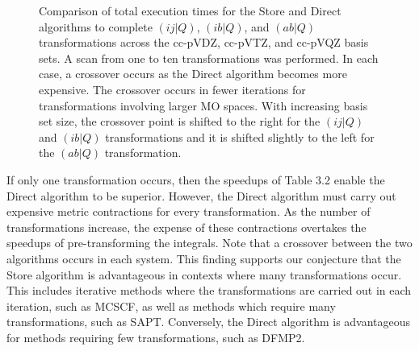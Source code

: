 \begin{figure}[H]
  \hfill
  \caption{Comparison of total execution times for the Store and Direct algorithms to complete $(ij|Q)$, $(ib|Q)$, and $(ab|Q)$ transformations
across the cc-pVDZ, cc-pVTZ, and cc-pVQZ basis sets. A scan from one to ten transformations was performed. In each case, a crossover
occurs as the Direct algorithm becomes more expensive. The crossover occurs in fewer iterations for transformations involving larger MO spaces.
With increasing basis set size, the crossover point is shifted to the right for the $(ij|Q)$ and $(ib|Q)$
transformations and it is shifted slightly to the left for the $(ab|Q)$ transformation.}
\end{figure}

If only one transformation occurs, then the speedups of Table 3.2 enable the Direct algorithm to be superior. 
However, the Direct algorithm must carry out expensive metric contractions for every transformation. As the
number of transformations increase, the expense of these contractions
overtakes the speedups of pre-transforming the integrals. Note that a crossover between the two algorithms occurs in each system. 
This finding supports our conjecture that the Store algorithm is advantageous in contexts where many transformations occur. 
This includes iterative methods where the transformations
are carried out in each iteration, such as MCSCF, as well as methods which require many transformations, such as SAPT.
Conversely, the Direct algorithm is advantageous for methods
requiring few transformations, such as DFMP2.

